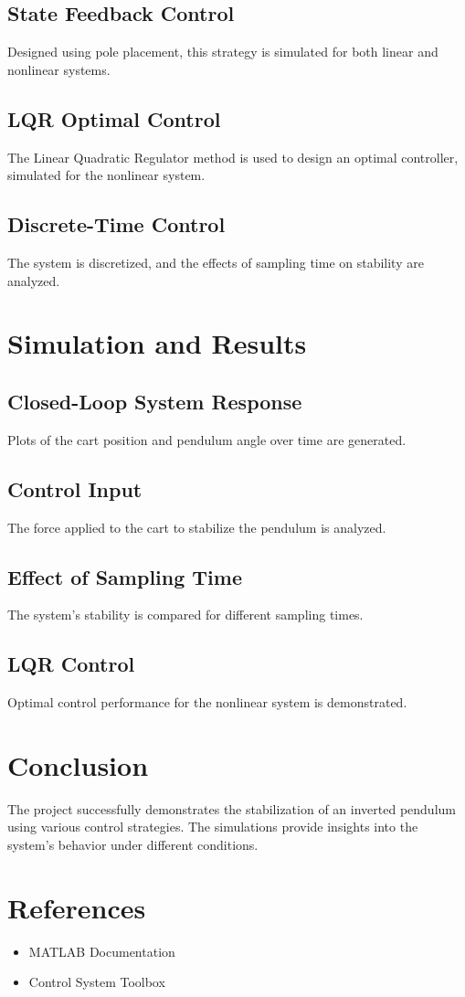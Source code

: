 \documentclass[a4paper, 12pt]{article}
\begin{document}
\subsection{State Feedback Control}
Designed using pole placement, this strategy is simulated for both linear and nonlinear systems.

\subsection{LQR Optimal Control}
The Linear Quadratic Regulator method is used to design an optimal controller, simulated for the nonlinear system.

\subsection{Discrete-Time Control}
The system is discretized, and the effects of sampling time on stability are analyzed.

\section{Simulation and Results}
\subsection{Closed-Loop System Response}
Plots of the cart position and pendulum angle over time are generated.

\subsection{Control Input}
The force applied to the cart to stabilize the pendulum is analyzed.

\subsection{Effect of Sampling Time}
The system's stability is compared for different sampling times.

\subsection{LQR Control}
Optimal control performance for the nonlinear system is demonstrated.

\section{Conclusion}
The project successfully demonstrates the stabilization of an inverted pendulum using various control strategies. The simulations provide insights into the system's behavior under different conditions.

\section{References}
\begin{itemize}
    \item MATLAB Documentation
    \item Control System Toolbox
\end{itemize}
\end{document}
